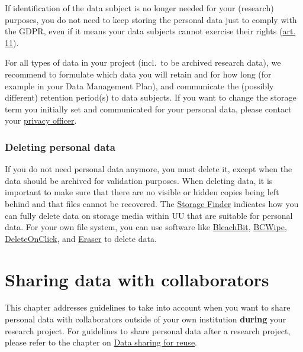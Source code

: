 \documentclass[
]{book}
\begin{document}
If identification of the data subject is no longer needed for your
(research) purposes, you do not need to keep storing the personal data just
to comply with the GDPR, even if it means your data subjects cannot exercise
their rights (\href{https://gdpr-info.eu/art-11-gdpr/}{art. 11}).

For all types of data in your project (incl.~to be archived research data), we
recommend to formulate which data you will retain and for how long (for example
in your Data Management Plan), and communicate the (possibly different)
retention period(s) to data subjects. If you want to change the storage term you
initially set and communicated for your personal data, please contact your
\protect\hyperlink{support}{privacy officer}.

\hypertarget{deleting-personal-data}{%
\subsection{Deleting personal data}\label{deleting-personal-data}}

If you do not need personal data anymore, you must delete it, except when the data
should be archived for validation purposes. When deleting data, it is important
to make sure that there are no visible or hidden copies being left behind and
that files cannot be recovered. The
\href{https://tools.uu.nl/storagefinder/}{Storage Finder}
indicates how you can fully delete data on storage media within UU that are
suitable for personal data. For your own file system, you can use software like
\href{https://www.bleachbit.org/}{BleachBit},
\href{https://www.jetico.com/data-wiping/wipe-files-bcwipe}{BCWipe},
\href{https://www.2brightsparks.com/onclick/help/welcomedeleteonclick.htm}{DeleteOnClick},
and \href{https://eraser.heidi.ie/}{Eraser} to delete data.

\hypertarget{data-sharing-collaboration}{%
\chapter{Sharing data with collaborators}\label{data-sharing-collaboration}}

This chapter addresses guidelines to take into account when you want to share
personal data with collaborators outside of your own institution \textbf{during}
your research project. For guidelines to share personal data after a research
project, please refer to the chapter on \protect\hyperlink{data-sharing-reuse}{Data sharing for reuse}.
\end{document}
